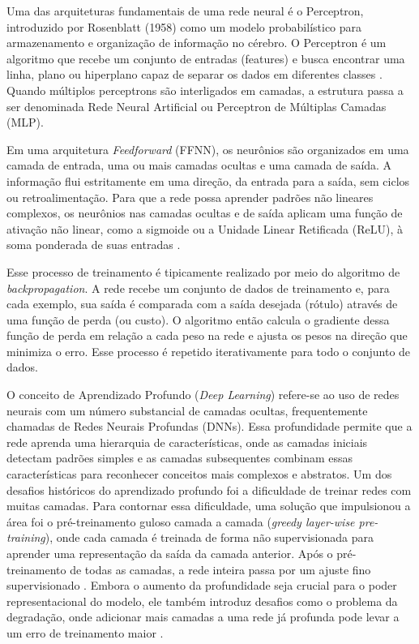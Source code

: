 Uma das arquiteturas fundamentais de uma rede neural é o Perceptron, introduzido por Rosenblatt (1958) como um modelo probabilístico para armazenamento e organização de informação no cérebro. O Perceptron é um algoritmo que recebe um conjunto de entradas (features) e busca encontrar uma linha, plano ou hiperplano capaz de separar os dados em diferentes classes . Quando múltiplos perceptrons são interligados em camadas, a estrutura passa a ser denominada Rede Neural Artificial ou Perceptron de Múltiplas Camadas (MLP).

Em uma arquitetura \textit{Feedforward} (FFNN), os neurônios são organizados em uma camada de entrada, uma ou mais camadas ocultas e uma camada de saída. A informação flui estritamente em uma direção, da entrada para a saída, sem ciclos ou retroalimentação. Para que a rede possa aprender padrões não lineares complexos, os neurônios nas camadas ocultas e de saída aplicam uma função de ativação não linear, como a sigmoide ou a Unidade Linear Retificada (ReLU), à soma ponderada de suas entradas .

Esse processo de treinamento é tipicamente realizado por meio do algoritmo de \textit{backpropagation}. A rede recebe um conjunto de dados de treinamento e, para cada exemplo, sua saída é comparada com a saída desejada (rótulo) através de uma função de perda (ou custo). O algoritmo então calcula o gradiente dessa função de perda em relação a cada peso na rede e ajusta os pesos na direção que minimiza o erro. Esse processo é repetido iterativamente para todo o conjunto de dados.

O conceito de Aprendizado Profundo (\textit{Deep Learning}) refere-se ao uso de redes neurais com um número substancial de camadas ocultas, frequentemente chamadas de Redes Neurais Profundas (DNNs). Essa profundidade permite que a rede aprenda uma hierarquia de características, onde as camadas iniciais detectam padrões simples e as camadas subsequentes combinam essas características para reconhecer conceitos mais complexos e abstratos. Um dos desafios históricos do aprendizado profundo foi a dificuldade de treinar redes com muitas camadas. Para contornar essa dificuldade, uma solução que impulsionou a área foi o pré-treinamento guloso camada a camada (\textit{greedy layer-wise pre-training}), onde cada camada é treinada de forma não supervisionada para aprender uma representação da saída da camada anterior. Após o pré-treinamento de todas as camadas, a rede inteira passa por um ajuste fino supervisionado . Embora o aumento da profundidade seja crucial para o poder representacional do modelo, ele também introduz desafios como o problema da degradação, onde adicionar mais camadas a uma rede já profunda pode levar a um erro de treinamento maior .

